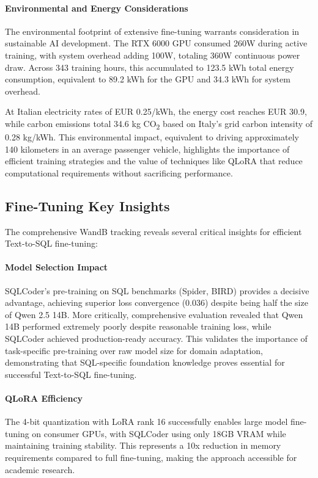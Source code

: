 \paragraph{Environmental and Energy Considerations}

The environmental footprint of extensive fine-tuning warrants consideration in sustainable AI development. The RTX 6000 GPU consumed 260W during active training, with system overhead adding 100W, totaling 360W continuous power draw. Across 343 training hours, this accumulated to 123.5 kWh total energy consumption, equivalent to 89.2 kWh for the GPU and 34.3 kWh for system overhead.

At Italian electricity rates of EUR 0.25/kWh, the energy cost reaches EUR 30.9, while carbon emissions total 34.6 kg CO\textsubscript{2} based on Italy's grid carbon intensity of 0.28 kg/kWh. This environmental impact, equivalent to driving approximately 140 kilometers in an average passenger vehicle, highlights the importance of efficient training strategies and the value of techniques like QLoRA that reduce computational requirements without sacrificing performance.

\subsection{Fine-Tuning Key Insights}

The comprehensive WandB tracking reveals several critical insights for efficient Text-to-SQL fine-tuning:

\paragraph{Model Selection Impact}
SQLCoder's pre-training on SQL benchmarks (Spider, BIRD) provides a decisive advantage, achieving superior loss convergence (0.036) despite being half the size of Qwen 2.5 14B. More critically, comprehensive evaluation revealed that Qwen 14B performed extremely poorly despite reasonable training loss, while SQLCoder achieved production-ready accuracy. This validates the importance of task-specific pre-training over raw model size for domain adaptation, demonstrating that SQL-specific foundation knowledge proves essential for successful Text-to-SQL fine-tuning.

\paragraph{QLoRA Efficiency}
The 4-bit quantization with LoRA rank 16 successfully enables large model fine-tuning on consumer GPUs, with SQLCoder using only 18GB VRAM while maintaining training stability. This represents a 10x reduction in memory requirements compared to full fine-tuning, making the approach accessible for academic research.

